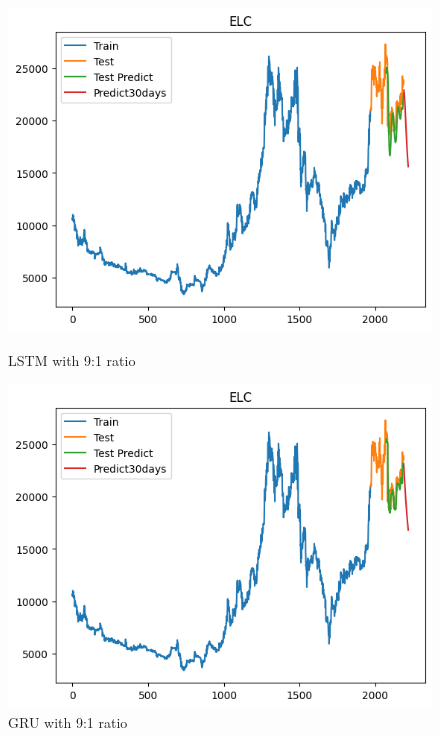 \documentclass[conference]{IEEEtran}
\begin{document}
\begin{figure}[H]
    \centering
    \begin{minipage}{0.24\textwidth}
        \centering
        \includegraphics[width=\textwidth]{Figure/ELC/lstm91.png}
        \caption{LSTM with 9:1 ratio}
        \label{fig:image1}
    \end{minipage}
    \hfill
    \begin{minipage}{0.24\textwidth}
        \centering
        \includegraphics[width=\textwidth]{Figure/ELC/gru91.png}
        \caption{GRU with 9:1 ratio}
        \label{fig:image2}
    \end{minipage}
\end{figure}
\end{document}
